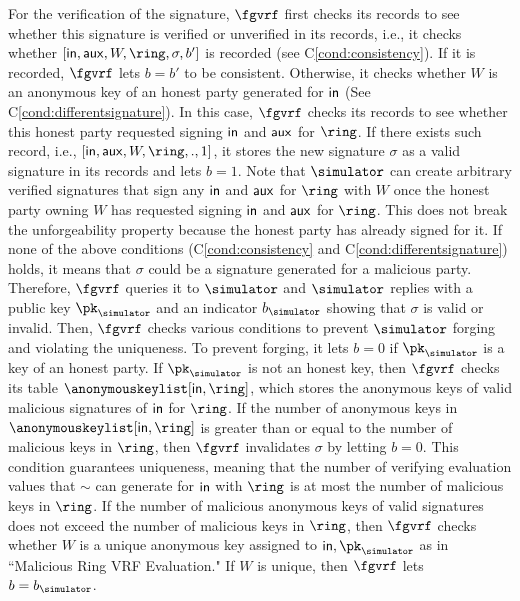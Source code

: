 For the verification of the signature, $ \fgvrf $  first checks its records to see whether this signature is verified or unverified in its records, i.e., it checks  whether $ [\msg,\aux,W,\ring,\sigma, b'] $ is recorded (see  C\ref{cond:consistency}). If it is recorded, $ \fgvrf $ lets  $ b = b' $ to be consistent. Otherwise, it checks whether $ W $ is an anonymous key of an honest party generated for $ \mathsf{in} $ (See C\ref{cond:differentsignature}). In this case, $ \fgvrf $ checks  its records to see whether this honest party requested signing  $ \mathsf{in} $ and $ \mathsf{aux} $ for $ \ring $.  If there exists such record, i.e., $ [\msg, \aux, W, \ring, ., 1] $, it stores the new signature $ \sigma $ as a valid signature in its records and lets $ b = 1 $. Note that $ \simulator $ can create arbitrary verified signatures that sign any $ \mathsf{in} $ and $ \mathsf{aux} $ for $ \ring $ with $ W $ once the honest party owning $ W $ has requested signing $ \mathsf{in} $ and $ \mathsf{aux} $ for $ \ring $. This does not break the unforgeability property because the honest party has already signed for it. 
If none of the above conditions (C\ref{cond:consistency} and C\ref{cond:differentsignature}) holds, it means that $ \sigma $ could be a signature generated for a malicious party. Therefore, $ \fgvrf $ queries it to $ \simulator $ and $ \simulator $ replies with  a public key $ \pk_\simulator $ and an indicator $ b_\simulator $ showing that $ \sigma  $ is valid or invalid. Then, $ \fgvrf $ checks various conditions to prevent $ \simulator $ forging and violating the uniqueness. To prevent forging, it lets $ b = 0 $ if $ \pk_\simulator $ is a key of an honest party. If $ \pk_\simulator $ is not an honest key, then $ \fgvrf $ checks its table $ \anonymouskeylist[\msg,\ring] $, which stores the anonymous keys of valid malicious signatures of $ \mathsf{in} $ for $ \ring $. If the number of anonymous keys in $ \anonymouskeylist[\msg,\ring] $ is greater than or equal to the number of malicious keys in $ \ring $, then $ \fgvrf $ invalidates $ \sigma $ by letting $ b = 0 $. This condition guarantees  uniqueness, meaning that the number of verifying evaluation values that $ \sim $ can generate for $ \mathsf{in} $ with $ \ring $ is at most the  number of malicious keys in $ \ring $. If the number of malicious anonymous keys of valid signatures does not exceed the number of malicious keys in $ \ring $, then $ \fgvrf $ checks whether $ W $ is a unique anonymous key assigned to $ \msg,\pk_\simulator $ as in ``Malicious Ring VRF Evaluation." If $ W $ is unique, then $ \fgvrf $ lets $ b = b_\simulator $.

